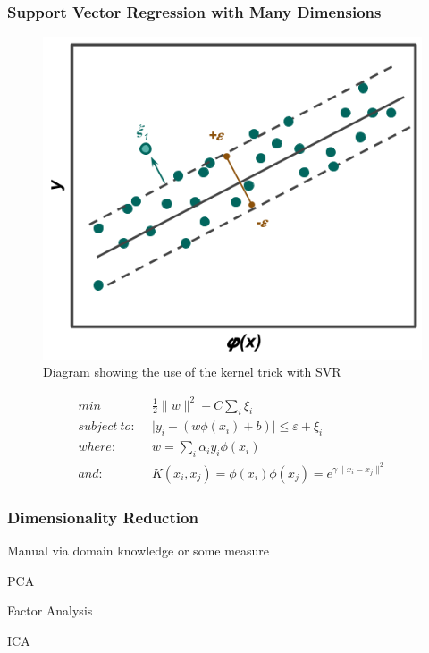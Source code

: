 \begin{frame}
  \frametitle{Support Vector Regression with Many Dimensions}
  \begin{minipage}{.5\textwidth}
    \centering
    \begin{figure}
      \centering
      \includegraphics[width=\linewidth]{./figures/svr-b.png}
      \caption{Diagram showing the use of the kernel trick with SVR}
    \end{figure}
  \end{minipage}%
  \begin{minipage}{.4\textwidth}
    \centering
    \small
    \begin{equation}
      \begin{split}
        min\ & \frac{1}{2} \lVert w \rVert ^{2} + C \sum_{i} \xi_{i} \\
        subject\ to:\ \ & \lvert y_i - (w \phi(x_i) + b) \rvert \leq \varepsilon + \xi_i \\
        where:\ & w = \sum_{i} \alpha_i y_i \phi(x_i) \\
        and:\ & K(x_i, x_j) = \phi(x_i) \phi(x_j) = e^{\gamma \lVert x_i - x_j \rVert ^{2}}
      \end{split}
    \end{equation} 
    \normalsize
  \end{minipage}
\end{frame}

\begin{frame}
  \frametitle{Dimensionality Reduction}
  Manual via domain knowledge or some measure
  
  PCA

  Factor Analysis

  ICA
\end{frame}
